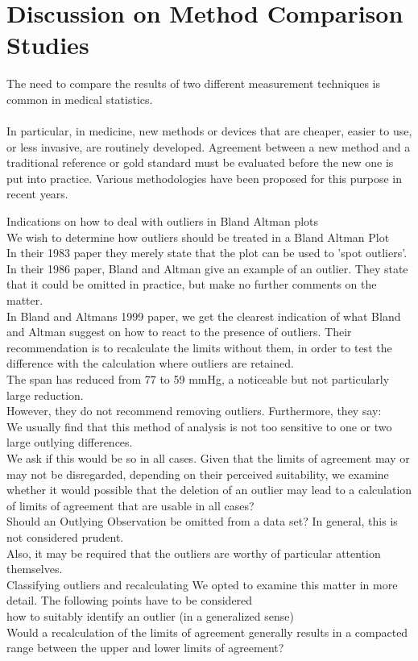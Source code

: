 \documentclass[12pt, a4paper]{report}
\theoremstyle{plain}
\theoremstyle{definition}
\theoremstyle{remark}
\begin{document}
	\section{Discussion on Method Comparison Studies}
	
	The need to compare the results of two different measurement
	techniques is common in medical statistics.
	\\
	\\
	In particular, in medicine, new methods or devices that are
	cheaper, easier to use, or less invasive, are routinely developed.
	Agreement between a new method and a traditional reference or gold
	standard must be evaluated before the new one is put into
	practice. Various methodologies have been proposed for this
	purpose in recent years.
	
	Indications on how to deal with outliers in Bland Altman plots
	\\
	We wish to determine how outliers should be treated in a Bland
	Altman Plot
	\\
	In their 1983 paper they merely state that the plot can be used to
	'spot outliers'.
	\\
	In  their 1986 paper, Bland and Altman give an example of an
	outlier. They state that it could be omitted in practice, but make
	no further comments on the matter.
	\\
	In Bland and Altmans 1999 paper, we get the clearest indication of
	what Bland and Altman suggest on how to react to the presence of
	outliers. Their recommendation is to recalculate the limits
	without them, in order to test the difference with the calculation
	where outliers are retained.\\
	
	The span has reduced from 77 to 59 mmHg, a noticeable but not
	particularly large reduction.
	\\
	However, they do not recommend removing outliers. Furthermore,
	they say:
	\\
	We usually find that this method of analysis is not too sensitive
	to one or two large outlying differences.
	\\
	We ask if this would be so in all cases. Given that the limits of
	agreement may or may not be disregarded, depending on their
	perceived suitability, we examine whether it would possible that
	the deletion of an outlier may lead to a calculation of limits of
	agreement that are usable in all cases?
	\\
	Should an Outlying Observation be omitted from a data set? In
	general, this is not considered prudent.
	\\
	Also, it may be required that the outliers are worthy of
	particular attention themselves.
	\\
	Classifying outliers and recalculating We opted to examine this
	matter in more detail. The following points have to be considered
	\\how to suitably identify an outlier (in a generalized sense)
	\\Would a recalculation of the limits of agreement generally
	results in  a compacted range between the upper and lower limits
	of agreement?
\end{document}
